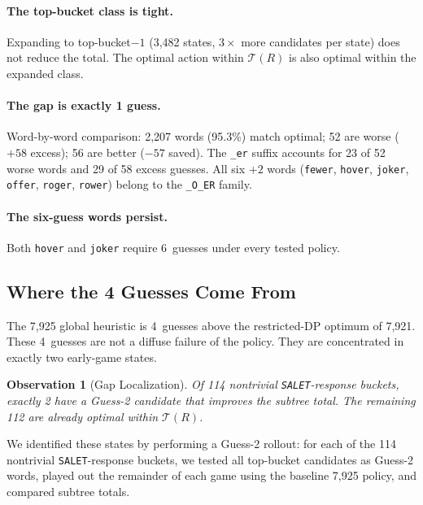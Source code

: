 \documentclass[11pt]{article}
\newtheorem{observation}{Observation}
\begin{document}
	\paragraph{The top-bucket class is tight.}
	Expanding to top-bucket$-1$ (3,482 states, $3\times$ more candidates per state) does not reduce the total.  The optimal action within $\mathcal{T}(R)$ is also optimal within the expanded class.
	
	\paragraph{The gap is exactly 1 guess.}
	Word-by-word comparison: 2,207 words (95.3\%) match optimal; 52 are worse ($+58$ excess); 56 are better ($-57$ saved).  The \texttt{\_er} suffix accounts for 23 of 52 worse words and 29 of 58 excess guesses.  All six $+2$ words (\texttt{fewer}, \texttt{hover}, \texttt{joker}, \texttt{offer}, \texttt{roger}, \texttt{rower}) belong to the \texttt{\_O\_ER} family.
	
	\paragraph{The six-guess words persist.}
	Both \texttt{hover} and \texttt{joker} require 6~guesses under every tested policy.
	
	\subsection{Where the 4 Guesses Come From}
	\label{sec:4guesses}
	
	The 7,925 global heuristic is 4~guesses above the restricted-DP optimum of 7,921.  These 4~guesses are not a diffuse failure of the policy.  They are concentrated in exactly two early-game states.
	
	\begin{observation}[Gap Localization]\label{obs:gap}
		Of 114 nontrivial \texttt{SALET}-response buckets, exactly 2 have a Guess-2 candidate that improves the subtree total.  The remaining 112 are already optimal within $\mathcal{T}(R)$.
	\end{observation}
	
	We identified these states by performing a Guess-2 rollout: for each of the 114 nontrivial \texttt{SALET}-response buckets, we tested all top-bucket candidates as Guess-2 words, played out the remainder of each game using the baseline 7,925 policy, and compared subtree totals.
	
\end{document}
